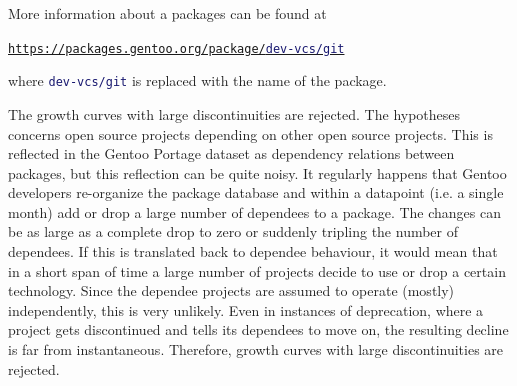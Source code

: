 \documentclass[smallextended,final]{svjour3}
\begin{document}
More information about a packages can be found at
\begin{center}
\href{https://packages.gentoo.org/package/dev-vcs/git}{\texttt{https://packages.gentoo.org/package/\textcolor{MidnightBlue}{dev-vcs/git}}}
\end{center}
where \texttt{\textcolor{MidnightBlue}{dev-vcs/git}} is replaced with the name of the package.

The growth curves with large discontinuities are rejected. The hypotheses concerns open source projects depending on other open source projects. This is reflected in the Gentoo Portage dataset as dependency relations between packages, but this reflection can be quite noisy. It regularly happens that Gentoo developers re-organize the package database and within a datapoint (i.e. a single month) add or drop a large number of dependees to a package. The changes can be as large as a complete drop to zero or suddenly tripling the number of dependees. If this is translated back to dependee behaviour, it would mean that in a short span of time a large number of projects decide to use or drop a certain technology. Since the dependee projects are assumed to operate (mostly) independently, this is very unlikely. Even in instances of deprecation, where a project gets discontinued and tells its dependees to move on, the resulting decline is far from instantaneous. Therefore, growth curves with large discontinuities are rejected.
\end{document}
